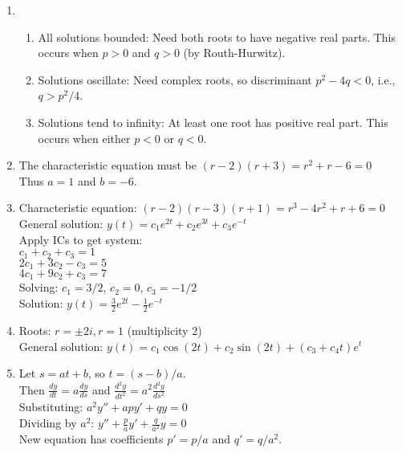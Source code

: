 \documentclass[12pt]{article}
\begin{document}
\begin{enumerate}[resume]
\item
\begin{enumerate}[label=(\alph*)]
    \item All solutions bounded: Need both roots to have negative real parts. This occurs when $p > 0$ and $q > 0$ (by Routh-Hurwitz).
    \item Solutions oscillate: Need complex roots, so discriminant $p^2 - 4q < 0$, i.e., $q > p^2/4$.
    \item Solutions tend to infinity: At least one root has positive real part. This occurs when either $p < 0$ or $q < 0$.
\end{enumerate}

\item The characteristic equation must be $(r-2)(r+3) = r^2 + r - 6 = 0$\\
Thus $a = 1$ and $b = -6$.

\item Characteristic equation: $(r-2)(r-3)(r+1) = r^3 - 4r^2 + r + 6 = 0$\\
General solution: $y(t) = c_1e^{2t} + c_2e^{3t} + c_3e^{-t}$\\
Apply ICs to get system:\\
$c_1 + c_2 + c_3 = 1$\\
$2c_1 + 3c_2 - c_3 = 5$\\
$4c_1 + 9c_2 + c_3 = 7$\\
Solving: $c_1 = 3/2$, $c_2 = 0$, $c_3 = -1/2$\\
Solution: $y(t) = \frac{3}{2}e^{2t} - \frac{1}{2}e^{-t}$

\item Roots: $r = \pm 2i, r = 1$ (multiplicity 2)\\
General solution: $y(t) = c_1\cos(2t) + c_2\sin(2t) + (c_3 + c_4t)e^t$

\item Let $s = at + b$, so $t = (s-b)/a$.\\
Then $\frac{dy}{dt} = a\frac{dy}{ds}$ and $\frac{d^2y}{dt^2} = a^2\frac{d^2y}{ds^2}$\\
Substituting: $a^2y'' + apy' + qy = 0$\\
Dividing by $a^2$: $y'' + \frac{p}{a}y' + \frac{q}{a^2}y = 0$\\
New equation has coefficients $p' = p/a$ and $q' = q/a^2$.
\end{enumerate}
\end{document}

